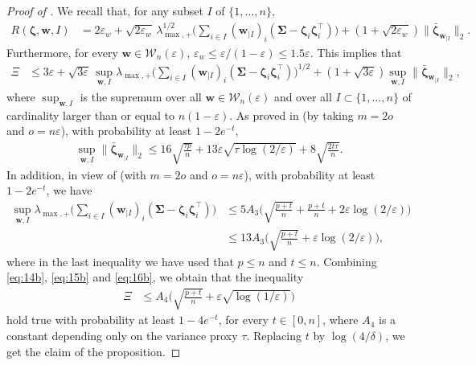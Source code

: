 \documentclass[aos,preprint,reqno]{imsart}
\newcommand\bzeta{\boldsymbol\zeta}
\newcommand\bSigma{\boldsymbol\Sigma}
\newcommand\bw{\boldsymbol w}
\theoremstyle{plain}
\theoremstyle{remark}
\begin{document}
    \begin{proof}[Proof of ]
	We recall that, for any subset $I$ of $\{1,\ldots,n\}$,
	\begin{align} 
		R(\bzeta,\bw, I) 
			&= 2\varepsilon_{w}+\sqrt{2\varepsilon_{w}}\,\lambda_{\max,+}^{1/2}
			\bigg(\sum_{i\in I} (\bw_{| I})_i (\bSigma - 
			\bzeta_i\bzeta_i^\top)\bigg) + (1+\sqrt{2\varepsilon_{w}}) 
			\|\bar{\bzeta}_{\bw_{|I}}\|_2.
	\end{align}
	Furthermore, for every $\bw\in\mathcal W_n
	(\varepsilon)$, $\varepsilon_w\le \varepsilon/(1-\varepsilon)\le 1.5\varepsilon$. 
	This implies that 
	\begin{align} 
		\Xi &\le 3\varepsilon 
			+ \sqrt{3\varepsilon}\,\sup_{\bw,I}
			\lambda_{\max,+}\bigg(\sum_{i\in I} (\bw_{| I})_i (\bSigma - 
			\bzeta_i\bzeta_i^\top)\bigg)^{1/2}
			+ (1+\sqrt{3\varepsilon}) 
			\sup_{\bw,I}\|\bar{\bzeta}_{\bw_{|I}}\|_2,\label{eq:14b}
	\end{align}
	where $\sup_{\bw,I}$ is the supremum over all $\bw\in\mathcal
	W_n(\varepsilon)$ and over all $I\subset\{1,\ldots,n\}$ of 
	cardinality larger than or equal to $n(1-\varepsilon)$. As proved 
	in  (by taking $m=2o$ and $o=n\varepsilon$), with
	probability at least $1-2e^{-t}$,
	\begin{align} \label{eq:15b}
		\sup_{\bw,I}\|\bar{\bzeta}_{\bw_{|I}}\|_2 \le 
		16\sqrt{\frac{\tau p}{n}} + 13\varepsilon\sqrt{\tau\log(2/\varepsilon)} + 
		8\sqrt{\frac{2t\tau}{n}}.
	\end{align}
	In addition, in view of  (with $m=2o$ and
	$o=n\varepsilon$), with probability at least $1-2e^{-t}$, we have
	\begin{align} 
		\sup_{\bw,I}\lambda_{\max,+}\bigg(\sum_{i\in I} (\bw_{| I})_i
		    (\bSigma - \bzeta_i\bzeta_i^\top)\bigg)
		&\le 5A_3 \bigg( \sqrt{ \frac{p+t}{n}} + 
			\frac{p + t}{n} + 2\varepsilon\log(2/\varepsilon)\bigg)\\
		&\le 13 A_3 \bigg( 
			\sqrt{\frac{p + t}{n}} + \varepsilon\log(2/\varepsilon)\bigg),
			\label{eq:16b}	
	\end{align}
	where in the last inequality we have used that $p\le n$ and $t\le n$. 
	Combining \eqref{eq:14b}, \eqref{eq:15b} and \eqref{eq:16b}, we 
	obtain that the inequality
	\begin{align} 
		\Xi &\le A_4\bigg(\sqrt{\frac{p + t}{n}} + \varepsilon
		\sqrt{\log(1/\varepsilon)}\bigg)
	\end{align}
	hold true with probability at least $1-4e^{-t}$, for every $t\in[0,n]$, where $A_4$ is a constant depending only
	on the variance proxy $\tau$. Replacing $t$ by $\log(4/\delta)$, 
	we get the claim of the proposition.
	\end{proof}
\end{document}
